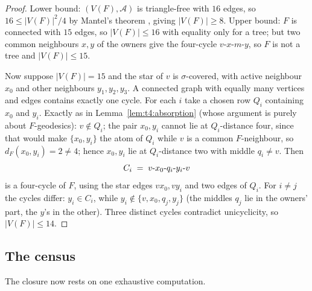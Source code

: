 \begin{proof}
Lower bound: \((V(F),\mathcal A)\) is triangle-free with \(16\) edges,
so \(16\le|V(F)|^2/4\) by Mantel's theorem \cite{Mantel07}, giving
\(|V(F)|\ge8\). Upper bound: \(F\) is connected with \(15\) edges, so
\(|V(F)|\le16\) with equality only for a tree; but two common
neighbours \(x,y\) of the owners give the four-cycle \(v\)-\(x\)-\(m\)-\(y\),
so \(F\) is not a tree and \(|V(F)|\le15\).

Now suppose \(|V(F)|=15\) and the star of \(v\) is \(\sigma\)-covered,
with active neighbour \(x_0\) and other neighbours \(y_1,y_2,y_3\).
A connected graph with equally many vertices and edges contains exactly
one cycle. For each \(i\) take a chosen row \(Q_i\) containing \(x_0\)
and \(y_i\). Exactly as in Lemma~\ref{lem:t4:absorption} (whose
argument is purely about \(F\)-geodesics): \(v\notin Q_i\); the pair
\(x_0,y_i\) cannot lie at \(Q_i\)-distance four, since that would make
\(\{x_0,y_i\}\) the atom of \(Q_i\) while \(v\) is a common
\(F\)-neighbour, so \(d_F(x_0,y_i)=2\ne4\); hence \(x_0,y_i\) lie at
\(Q_i\)-distance two with middle \(q_i\ne v\). Then
\[
 C_i\;=\;v\hbox{-}x_0\hbox{-}q_i\hbox{-}y_i\hbox{-}v
\]
is a four-cycle of \(F\), using the star edges \(vx_0,vy_i\) and two
edges of \(Q_i\). For \(i\ne j\) the cycles differ: \(y_i\in C_i\),
while \(y_i\notin\{v,x_0,q_j,y_j\}\) (the middles \(q_j\) lie in the
owners' part, the \(y\)'s in the other). Three distinct cycles
contradict unicyclicity, so \(|V(F)|\le14\).
\end{proof}

\subsection{The census}\label{subsec:t4:census}

The closure now rests on one exhaustive computation.

